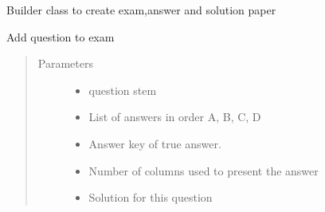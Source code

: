 \documentclass[letterpaper,10pt,english]{sphinxmanual}
\begin{document}
\begin{fulllineitems}
\label{\detokenize{index:pytexexam.builder.LatexExamBuilder}}
\sphinxAtStartPar
Builder class to create exam,answer and solution paper

\begin{fulllineitems}
\label{\detokenize{index:pytexexam.builder.LatexExamBuilder.add_question}}
\sphinxAtStartPar
Add question to exam
\begin{quote}\begin{description}
\item[{Parameters}] \leavevmode\begin{itemize}
\item {} 
\sphinxAtStartPar
{} \textendash{} question stem

\item {} 
\sphinxAtStartPar
{} \textendash{} List of answers in order A, B, C, D

\item {} 
\sphinxAtStartPar
{} \textendash{} Answer key of true answer.

\item {} 
\sphinxAtStartPar
{} \textendash{} Number of columns used to present the answer

\item {} 
\sphinxAtStartPar
{} \textendash{} Solution for this question

\end{itemize}

\end{description}\end{quote}


\end{fulllineitems}
\end{fulllineitems}
\end{document}
